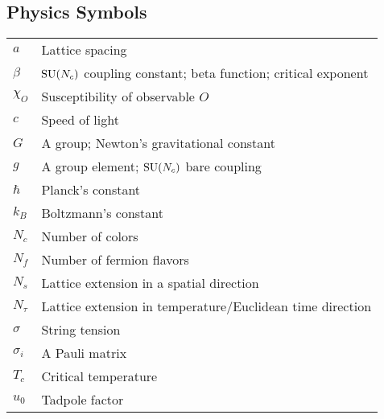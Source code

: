 \documentclass[12pt]{book}
\theoremstyle{definition}
\newenvironment{frontstuff}
  {\centering\chapter*{}}
  {\clearpage}
\begin{document}
\begin{frontstuff}
\section*{Physics Symbols}
\begin{tabular}{ll}
$a$             & Lattice spacing \\
$\beta$         & $\operatorname{SU}(N_c)$ coupling constant; beta function; critical exponent \\
$\chi_O$        & Susceptibility of observable $O$\\
$c$             & Speed of light\\
$G$             & A group; Newton's gravitational constant\\
$g$             & A group element; $\operatorname{SU}(N_c)$ bare coupling\\
$\hbar$         & Planck's constant \\
$k_B$           & Boltzmann's constant \\
$N_c$           & Number of colors \\
$N_f$           & Number of fermion flavors \\
$N_s$           & Lattice extension in a spatial direction \\
$N_\tau$        & Lattice extension in temperature/Euclidean time direction\\
$\sigma$        & String tension\\
$\sigma_i$      & A Pauli matrix\\
$T_c$           & Critical temperature\\ 
$u_0$           & Tadpole factor\\
\end{tabular}
\clearpage



\end{frontstuff}
\end{document}
